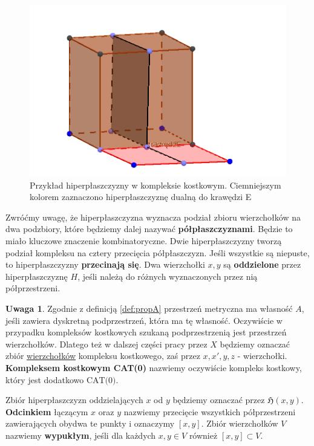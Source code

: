\documentclass[licencjacka]{pracamgr}
\theoremstyle{definition}
\theoremstyle{definition}
\newtheorem{remark}{Uwaga}[section]
\theoremstyle{definition}
\theoremstyle{definition}
\theoremstyle{definition}
\theoremstyle{plain}
\theoremstyle{plain}
\begin{document}
\begin{figure}
	\caption{\small{Przykład hiperpłaszczyzny w kompleksie kostkowym. Ciemniejszym kolorem
	zaznaczono hiperpłaszczyznę dualną do krawędzi E}}
	\centering
	\includegraphics{hiper}
\end{figure}

Zwróćmy uwagę, że hiperpłaszczyzna wyznacza podział zbioru wierzchołków na dwa 
podzbiory, które będziemy dalej nazywać \textbf{półpłaszczyznami}. 
Będzie to miało kluczowe znaczenie kombinatoryczne. 
Dwie hiperpłaszczyzny tworzą podział kompleksu na cztery przecięcia półpłaszczyzn. Jeśli 
wszystkie są niepuste, to hiperpłaszczyzny \textbf{przecinają się}. Dwa wierzchołki 
$ x,y $ są \textbf{oddzielone} przez hiperpłaszczyznę $ H $, jeśli należą do różnych 
wyznaczonych przez nią półprzestrzeni. 

\begin{remark}
	Zgodnie z definicją \ref{def:propA} przestrzeń metryczna ma własność $ A $, jeśli 
	zawiera dyskretną podprzestrzeń, która ma tę własność. Oczywiście w przypadku kompleksów 
	kostkowych szukaną podprzestrzenią jest przestrzeń wierzchołków. Dlatego też w dalszej 
	części pracy przez $ X $ będziemy oznaczać zbiór \underline{wierzchołków} 
	kompleksu kostkowego, zaś przez $ x, x', y, z $ - wierzchołki. \textbf{Kompleksem 
	kostkowym CAT(0)} nazwiemy oczywiście kompleks kostkowy, który jest dodatkowo 
	$ \text{CAT(0)} $. 
\end{remark}

Zbiór hiperpłaszczyzn oddzielających $ x $ od $ y $ będziemy oznaczać przez 
$\mathfrak{H}(x,y)$. \textbf{Odcinkiem} łączącym $ x $ oraz $ y $ nazwiemy przecięcie 
wszystkich półprzestrzeni zawierających obydwa te punkty i oznaczymy $ [x,y]$. Zbiór 
wierzchołków $ V $ nazwiemy \textbf{wypukłym}, jeśli dla każdych $ x,y \in V $ również 
$ [x,y] \subset V $.
\end{document}
